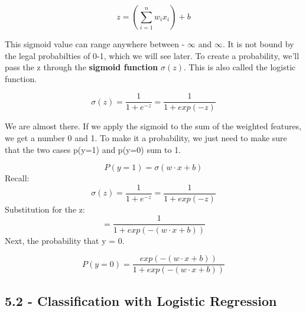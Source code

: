 \documentclass{article}
\begin{document}
\[
    z = (\sum_{i=1}^{n} w_i x_i) + b
\]

This sigmoid value can range anywhere between - $\infty$  and  $\infty$. It is not bound by the legal probabilties of 0-1, which we will see later. \newline
To create a probability, we'll pass the z through the \textbf{sigmoid function} $\sigma(z)$. This is also called the logistic function.


\[
    \sigma(z) = \frac{1}{1 + e^{-z}} = \frac{1} {1 + exp(-z)}
\]

We are almost there. If we apply the sigmoid to the sum of the weighted features, we get a number 0 and 1.
To make it a probability, we just need to make sure that the two cases p(y=1) and p(y=0) sum to 1.

\[
    P(y = 1) = \sigma (w \cdot x + b)
\]
Recall:
\[
    \sigma(z) = \frac{1}{1 + e^{-z}} = \frac{1} {1 + exp(-z)}
\]
Substitution for the z:
\[
    = \frac{1}{1 + exp(-(w \cdot x +b))}
\]
Next, the probability that y = 0.

\[
    P(y=0) = \frac {exp (-(w \cdot x + b))} {1 + exp(-(w \cdot x + b))}
\]

\subsection{ 5.2 - Classification with Logistic Regression}
\end{document}
